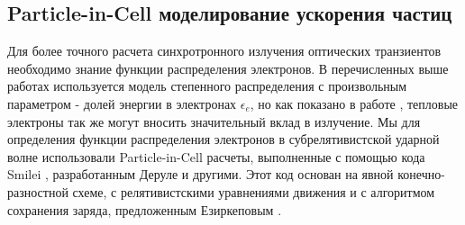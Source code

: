 \subsection{Particle-in-Cell моделирование ускорения частиц}
Для более точного расчета синхротронного излучения оптических транзиентов необходимо знание функции распределения электронов. В перечисленных выше работах используется модель степенного распределения с произвольным параметром - долей энергии в электронах $\epsilon_e$, но как показано в работе \cite{Margalit2021}, тепловые электроны так же могут вносить значительный вклад в излучение. Мы для определения функции распределения электронов в субрелятивистской ударной волне использовали Particle-in-Cell расчеты, выполненные с помощью кода Smilei \cite{Smilei18}, разработанным Деруле и другими. Этот код основан на явной конечно-разностной схеме, с релятивистскими уравнениями движения и с алгоритмом сохранения заряда, предложенным Езиркеповым \cite{Esirkepov}.

